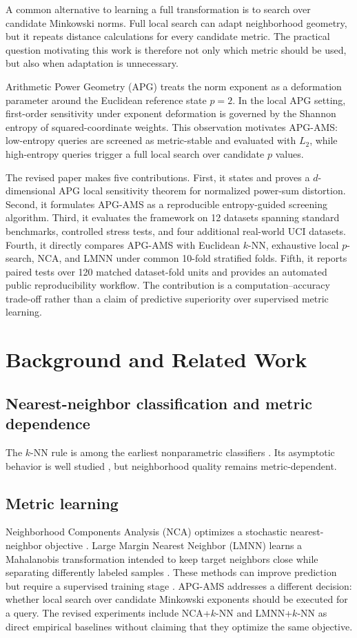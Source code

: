 \documentclass[11pt]{article}
\begin{document}
A common alternative to learning a full transformation is to search over candidate Minkowski norms. Full local search can adapt neighborhood geometry, but it repeats distance calculations for every candidate metric. The practical question motivating this work is therefore not only which metric should be used, but also when adaptation is unnecessary.

Arithmetic Power Geometry (APG) treats the norm exponent as a deformation parameter around the Euclidean reference state $p=2$. In the local APG setting, first-order sensitivity under exponent deformation is governed by the Shannon entropy of squared-coordinate weights. This observation motivates APG-AMS: low-entropy queries are screened as metric-stable and evaluated with $L_2$, while high-entropy queries trigger a full local search over candidate $p$ values.

The revised paper makes five contributions. First, it states and proves a $d$-dimensional APG local sensitivity theorem for normalized power-sum distortion. Second, it formulates APG-AMS as a reproducible entropy-guided screening algorithm. Third, it evaluates the framework on 12 datasets spanning standard benchmarks, controlled stress tests, and four additional real-world UCI datasets. Fourth, it directly compares APG-AMS with Euclidean $k$-NN, exhaustive local $p$-search, NCA, and LMNN under common 10-fold stratified folds. Fifth, it reports paired tests over 120 matched dataset-fold units and provides an automated public reproducibility workflow. The contribution is a computation--accuracy trade-off rather than a claim of predictive superiority over supervised metric learning.

\section{Background and Related Work}
\subsection{Nearest-neighbor classification and metric dependence}
The $k$-NN rule is among the earliest nonparametric classifiers \cite{cover1967}. Its asymptotic behavior is well studied \cite{devroye1996}, but neighborhood quality remains metric-dependent.

\subsection{Metric learning}
Neighborhood Components Analysis (NCA) optimizes a stochastic nearest-neighbor objective \cite{goldberger2005}. Large Margin Nearest Neighbor (LMNN) learns a Mahalanobis transformation intended to keep target neighbors close while separating differently labeled samples \cite{weinberger2009}. These methods can improve prediction but require a supervised training stage \cite{kulis2013,bellet2013}. APG-AMS addresses a different decision: whether local search over candidate Minkowski exponents should be executed for a query. The revised experiments include NCA+$k$-NN and LMNN+$k$-NN as direct empirical baselines without claiming that they optimize the same objective.
\end{document}
